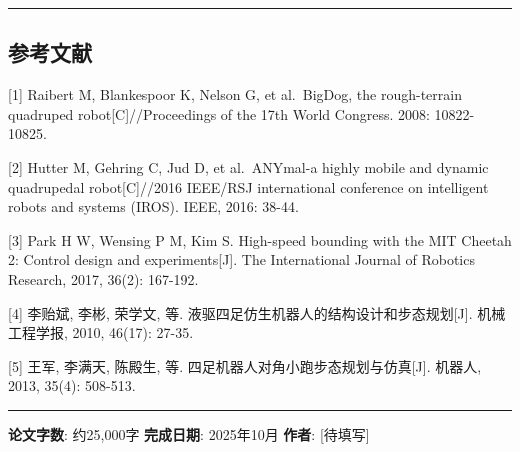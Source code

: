 \documentclass[
]{article}
\begin{document}
\begin{center}\rule{0.5\linewidth}{0.5pt}\end{center}

\hypertarget{ux53c2ux8003ux6587ux732e}{%
\subsection{参考文献}\label{ux53c2ux8003ux6587ux732e}}

{[}1{]} Raibert M, Blankespoor K, Nelson G, et al.~BigDog, the
rough-terrain quadruped robot{[}C{]}//Proceedings of the 17th World
Congress. 2008: 10822-10825.

{[}2{]} Hutter M, Gehring C, Jud D, et al.~ANYmal-a highly mobile and
dynamic quadrupedal robot{[}C{]}//2016 IEEE/RSJ international conference
on intelligent robots and systems (IROS). IEEE, 2016: 38-44.

{[}3{]} Park H W, Wensing P M, Kim S. High-speed bounding with the MIT
Cheetah 2: Control design and experiments{[}J{]}. The International
Journal of Robotics Research, 2017, 36(2): 167-192.

{[}4{]} 李贻斌, 李彬, 荣学文, 等.
液驱四足仿生机器人的结构设计和步态规划{[}J{]}. 机械工程学报, 2010,
46(17): 27-35.

{[}5{]} 王军, 李满天, 陈殿生, 等.
四足机器人对角小跑步态规划与仿真{[}J{]}. 机器人, 2013, 35(4): 508-513.

\begin{center}\rule{0.5\linewidth}{0.5pt}\end{center}

\textbf{论文字数}: 约25,000字 \textbf{完成日期}: 2025年10月
\textbf{作者}: {[}待填写{]}
\end{document}
